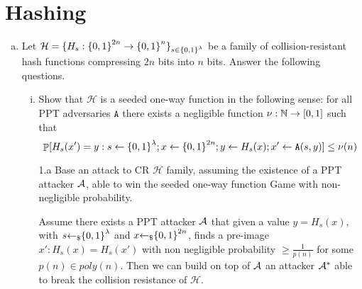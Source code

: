 \section{Hashing}
\begin{enumerate}[(a)]
	\item  Let $\mathcal{H} = \{H_s : {\{0, 1\}}^{2n} \to {\{0, 1\}}^n\}_{s\in{\{0, 1\}}^\lambda}$ be a family of collision-resistant hash
	      functions compressing $2n$ bits into $n$ bits. Answer the following questions.
	      \begin{enumerate}[(i)]
		      \item Show that $\mathcal{H}$ is a seeded one-way function in the following sense: for all PPT adversaries $\texttt{A}$ there exists a negligible function $\nu: {\mathbb N} \to [0, 1]$ such that
		            \[\mathop{\mathbb P}[H_s(x') = y: s \leftarrow {\{0, 1\}}^\lambda; x \leftarrow {\{0, 1\}}^{2n}; y \leftarrow H_s(x); x' \leftarrow \texttt{A}(s,y)] \le \nu(n) \]

		            \begin{solution}
			            \begin{cryptoredux}
				            {1.a}
				            {Base an attack to CR $\mathcal{H}$ family, assuming the existence of a PPT attacker $\mathcal{A}$, able to win the seeded one-way function Game with non-negligible probability.}
				            {}
				            {}
				            {}
				            \cseqdelay
				            \cseqdelay
			            \end{cryptoredux}
			            Assume there exists a PPT attacker $\mathcal{A}$ that given a value $y = H_s(x)$, with $s{\leftarrow_\$} {\{0, 1\}}^\lambda$ and $x{\leftarrow_\$}{\{0, 1\}}^{2n}$, finds a pre-image $x': H_s(x) = H_s(x')$ with non negligible probability $\ge \frac{1}{p(n)}$ for some $p(n) \in poly(n)$. Then we can build on top of $\mathcal{A}$ an attacker $\mathcal{A}^*$ able to break the collision resistance of $\mathcal{H}$.


\end{solution}
\end{enumerate}
\end{enumerate}
